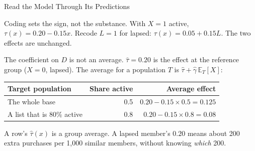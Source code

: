 \documentclass[aspectratio=169, 11pt, handout]{beamer}
\newcommand{\E}{\mathbb{E}}
\begin{document}
\begin{frame}{Read the Model Through Its Predictions}

Coding sets the sign, not the substance. With $X = 1$ active, $\tau(x) = 0.20 - 0.15x$. Recode $L = 1$ for lapsed: $\tau(x) = 0.05 + 0.15L$. The two effects are unchanged.

\bigskip

The coefficient on $D$ is not an average. $\widehat\tau = 0.20$ is the effect at the reference group ($X = 0$, lapsed). The average for a population $T$ is $\widehat\tau + \widehat\gamma\,\E_T[X]$:

\begin{center}
\begin{tabular}{lrr}
\toprule
\textbf{Target population} & \textbf{Share active} & \textbf{Average effect} \\
\midrule
The whole base & 0.5 & $0.20 - 0.15 \times 0.5 = 0.125$ \\
A list that is 80\% active & 0.8 & $0.20 - 0.15 \times 0.8 = 0.08$ \\
\bottomrule
\end{tabular}
\end{center}

\bigskip

A row's $\widehat\tau(x)$ is a group average. A lapsed member's $0.20$ means about 200 extra purchases per 1{,}000 similar members, without knowing \emph{which} 200.
\end{frame}
\end{document}
